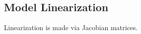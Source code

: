 \subsection{Model Linearization}
\label{subsec:model_linearization}

Linearization is made via Jacobian matrices.